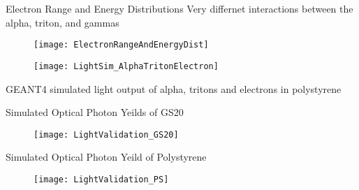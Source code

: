 \begin{frame}{Electron Range and Energy Distributions}
  Very differnet interactions between the alpha, triton, and gammas
  \begin{figure}
    \centering
    \texttt{[image: ElectronRangeAndEnergyDist]}
  \end{figure}
\end{frame}
\begin{frame}
  \begin{figure}
    \centering
    \texttt{[image: LightSim\_AlphaTritonElectron]}
  \end{figure}
  GEANT4 simulated light output of alpha, tritons and electrons in polystyrene
\end{frame}
\begin{frame}{Simulated Optical Photon Yeilds of GS20}
  \begin{figure}
    \centering
    \texttt{[image: LightValidation\_GS20]}
  \end{figure}
\end{frame}
\begin{frame}{Simulated Optical Photon Yeild of Polystyrene}
  \begin{figure}
    \centering
    \texttt{[image: LightValidation\_PS]}
  \end{figure}
  \vspace{2.5cm}
\end{frame}
